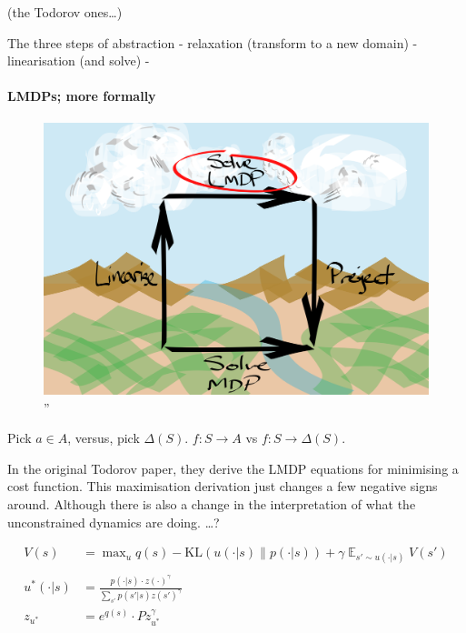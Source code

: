 (the Todorov ones\ldots{})

The three steps of abstraction - relaxation (transform to a new domain)
- linearisation (and solve) -

\hypertarget{lmdps-more-formally}{%
\paragraph{LMDPs; more formally}\label{lmdps-more-formally}}

\begin{figure}
\centering
\includegraphics[width=4.6875in,height=\textheight]{../../pictures/drawings/abstract-representations-solve.png}
\caption{''}
\end{figure}

Pick \(a \in A\), versus, pick \(\Delta(S)\). \(f: S\to A\) vs
\(f:S \to \Delta(S)\).

In the original Todorov paper, they derive the LMDP equations for
minimising a cost function. This maximisation derivation just changes a
few negative signs around. Although there is also a change in the
interpretation of what the unconstrained dynamics are doing. \ldots{}?

\begin{align}
V(s) &= \mathop{\text{max}}_{u} q(s) - \text{KL}(u(\cdot| s) \parallel p(\cdot | s)) + \gamma \mathop{\mathbb E}_{s' \sim u(\cdot | s)} V(s') \tag{1}\\
\\
u^{* }(\cdot | s) &= \frac{p(\cdot | s)\cdot z(\cdot)^{\gamma}}{\sum_{s'} p(s' | s) z(s')^{\gamma}} \tag{8}\\
z_{u^{* }} &= e^{q(s)}\cdot P z_{u^{* }}^{\gamma} \tag{11}\\
\end{align}

